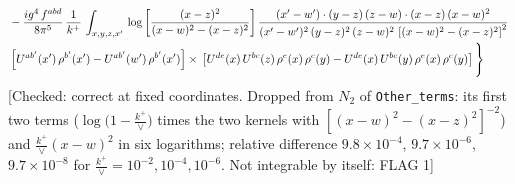 \documentclass[9pt]{article}
\numberwithin{equation}{section}
\begin{document}
\begin{align}
& -\frac{ig^{4}\, f^{abd}}{8\pi^{5}}\, \frac{1}{k^{+}}\, \int_{x,y,z,x'}\,\log{\left[\frac{(x-z)^{2}}{(x-w)^{2}-(x-z)^{2}}\right]}\,\frac{(x'-w')\cdot (y-z)\, (z-w)\cdot (x-z)\,(x-w)^{2}}{(x'-w')^{2}\, (y-z)^{2}\, (z-w)^{2}\,\left[(x-w)^{2}-(x-z)^{2}\right]^{2}}\, \notag \\ & \left[U^{ab'}(x')\,\rho^{b'}(x')-U^{ab'}(w')\, \rho^{b'}(x')\right]\times\,\left[U^{de}(x)\,U^{bc}(z)\, \rho^{e}(x)\,\rho^{c}(y)-U^{de}(x)\,U^{bc}(y)\,\rho^{e}(x)\,\rho^{c}(y)\right]\Bigg\}
\end{align} {\color{red}[Checked: correct at fixed coordinates. Dropped from $N_{2}$ of \texttt{Other\_terms}: its first two terms ($\log\big(1-\frac{k^{+}}{\vee}\big)$ times the two kernels with $[(x-w)^{2}-(x-z)^{2}]^{-2}$) and $\frac{k^{+}}{\vee}(x-w)^{2}$ in six logarithms; relative difference $9.8\times10^{-4}$, $9.7\times10^{-6}$, $9.7\times10^{-8}$ for $\frac{k^{+}}{\vee}=10^{-2},10^{-4},10^{-6}$. Not integrable by itself: FLAG 1]}\par\noindent
\end{document}
